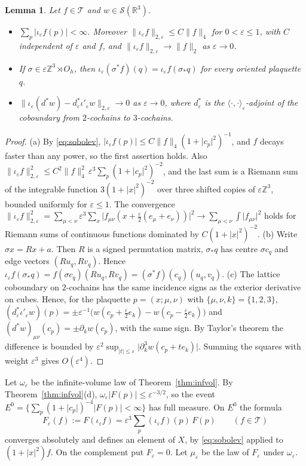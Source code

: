 \documentclass[11pt]{amsart}
\theoremstyle{plain}
\newtheorem{lemma}[theorem]{Lemma}
\theoremstyle{definition}
\theoremstyle{remark}
\numberwithin{equation}{section}
\newcommand{\R}{\mathbb{R}}
\newcommand{\Z}{\mathbb{Z}}
\newcommand{\eps}{\varepsilon}
\newcommand{\cT}{\mathcal{T}}
\newcommand{\cS}{\mathcal{S}}
\newcommand{\Oh}{O_h}
\newcommand{\abs}[1]{\lvert #1\rvert}
\newcommand{\norm}[1]{\lVert #1\rVert}
\newcommand{\ip}[2]{\langle #1,#2\rangle}
\begin{document}
\begin{lemma}\label{lem:sampling}
Let $f\in\cT$ and $w\in\cS(\R^3)$.
\begin{itemize}
\item[(a)] $\sum_p\abs{\iota_\eps f(p)}<\infty$. Moreover $\norm{\iota_\eps f}_{2,\eps}\le C\norm f_4$ for $0<\eps\le1$, with $C$ independent of $\eps$ and $f$, and $\norm{\iota_\eps f}_{2,\eps}\to\norm f_2$ as $\eps\to0$.
\item[(b)] If $\sigma\in\eps\Z^3\rtimes\Oh$, then $\iota_\eps(\sigma^*f)(q)=\iota_\eps f(\sigma_*q)$ for every oriented plaquette $q$.
\item[(c)] $\norm{\iota_\eps(d^*w)-d_\eps^*\iota'_\eps w}_{2,\eps}\to0$ as $\eps\to0$, where $d^*_\eps$ is the $\ip\cdot\cdot_\eps$-adjoint of the coboundary from $2$-cochains to $3$-cochains.
\end{itemize}
\end{lemma}

\begin{proof}
(a) By \eqref{eq:sobolev}, $\abs{\iota_\eps f(p)}\le C\norm f_4(1+\abs{c_p}^2)^{-1}$, and $f$ decays faster than any power, so the first assertion holds. Also $\norm{\iota_\eps f}_{2,\eps}^2\le C^2\norm f_4^2\,\eps^3\sum_p(1+\abs{c_p}^2)^{-2}$, and the last sum is a Riemann sum of the integrable function $3(1+\abs x^2)^{-2}$ over three shifted copies of $\eps\Z^3$, bounded uniformly for $\eps\le1$. The convergence $\norm{\iota_\eps f}^2_{2,\eps}=\sum_{\mu<\nu}\eps^3\sum_{x}\abs{f_{\mu\nu}(x+\frac\eps2(e_\mu+e_\nu))}^2\to\sum_{\mu<\nu}\int\abs{f_{\mu\nu}}^2$ holds for Riemann sums of continuous functions dominated by $C(1+\abs x^2)^{-2}$.
(b) Write $\sigma x=Rx+a$. Then $R$ is a signed permutation matrix, $\sigma_*q$ has centre $\sigma c_q$ and edge vectors $(Ru_q,Rv_q)$. Hence $\iota_\eps f(\sigma_*q)=f(\sigma c_q)(Ru_q,Rv_q)=(\sigma^*f)(c_q)(u_q,v_q)$.
(c) The lattice coboundary on $2$-cochains has the same incidence signs as the exterior derivative on cubes. Hence, for the plaquette $p=(x;\mu,\nu)$ with $\{\mu,\nu,k\}=\{1,2,3\}$, $(d^*_\eps\iota'_\eps w)(p)=\pm\eps^{-1}\big(w(c_p+\frac\eps2e_k)-w(c_p-\frac\eps2e_k)\big)$ and $(d^*w)_{\mu\nu}(c_p)=\pm\partial_kw(c_p)$, with the same sign. By Taylor's theorem the difference is bounded by $\eps^2\sup_{\abs t\le\eps}\abs{\partial_k^3w(c_p+te_k)}$. Summing the squares with weight $\eps^3$ gives $O(\eps^4)$.
\end{proof}

Let $\omega_\eps$ be the infinite-volume law of Theorem~\ref{thm:infvol}. By Theorem~\ref{thm:infvol}(d), $\omega_\eps\abs{F(p)}\le\eps^{-3/2}$, so the event $E^0=\{\sum_p(1+\abs{c_p})^{-4}\abs{F(p)}<\infty\}$ has full measure. On $E^0$ the formula
\begin{equation}\label{eq:Feps}
F_\eps(f):=F(\iota_\eps f)=\eps^3\sum_p(\iota_\eps f)(p)\,F(p)\qquad(f\in\cT)
\end{equation}
converges absolutely and defines an element of $X$, by \eqref{eq:sobolev} applied to $(1+\abs x^2)f$. On the complement put $F_\eps=0$. Let $\mu_\eps$ be the law of $F_\eps$ under $\omega_\eps$.
\end{document}
